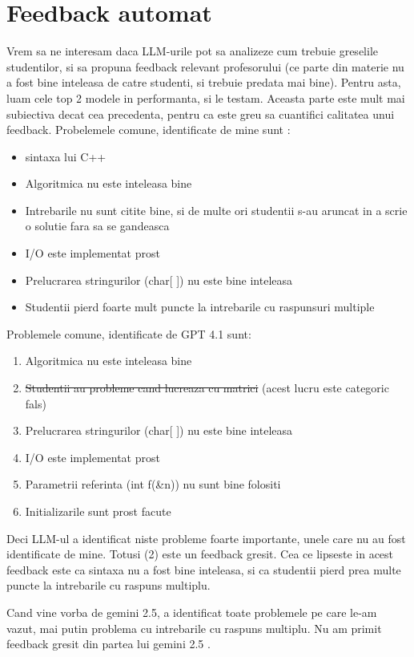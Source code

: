 \documentclass[12pt, a4paper]{report}
\begin{document}
\section{Feedback automat}
Vrem sa ne interesam daca LLM-urile pot sa analizeze cum trebuie greselile studentilor,
si sa propuna feedback relevant profesorului (ce parte din materie nu a fost bine inteleasa de catre studenti, si trebuie predata mai bine).
Pentru asta, luam cele top 2 modele in performanta, si le testam.
Aceasta parte este mult mai subiectiva decat cea precedenta, pentru ca este greu sa cuantifici calitatea unui feedback.
Probelemele comune, identificate de mine sunt :
\begin{itemize}
  \item sintaxa lui C++
  \item Algoritmica nu este inteleasa bine
  \item Intrebarile nu sunt citite bine, si de multe ori studentii s-au aruncat in a scrie o solutie fara sa se gandeasca
  \item I/O este implementat prost 
  \item Prelucrarea stringurilor (char[ ]) nu este bine inteleasa
  \item Studentii pierd foarte mult puncte la intrebarile cu raspunsuri multiple


\end{itemize}

Problemele comune, identificate de GPT 4.1 sunt:
\begin{enumerate}
  \item Algoritmica nu este inteleasa bine
  \item  \st{Studentii au probleme cand lucreaza cu matrici} (acest lucru este categoric fals)
  \item Prelucrarea stringurilor (char[ ]) nu este bine inteleasa
  \item I/O este implementat prost
  \item Parametrii referinta (int f(\&n)) nu sunt bine folositi
  \item Initializarile sunt prost facute
\end{enumerate}

Deci LLM-ul a identificat niste probleme foarte importante, unele care nu au fost identificate de mine. Totusi (2) este un feedback gresit.
Cea ce lipseste in acest feedback este ca sintaxa nu a fost bine inteleasa, si ca studentii pierd prea multe puncte la intrebarile cu raspuns multiplu.

Cand vine vorba de gemini 2.5, a identificat toate problemele pe care le-am vazut, mai putin problema cu intrebarile cu raspuns multiplu.
Nu am primit feedback gresit din partea lui gemini 2.5 .
\end{document}
